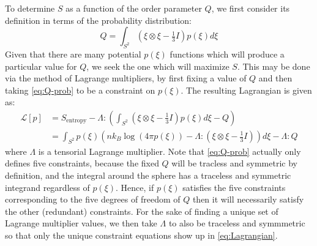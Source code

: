 \documentclass[reqno]{article}
\begin{document}
  To determine $S$ as a function of the order parameter $Q$, we first consider
  its definition in terms of the probability distribution:
  \begin{equation} \label{eq:Q-prob}
    Q
    =
    \int_{S^2} \left(\xi \otimes \xi - \tfrac13 I\right) p(\xi) d\xi
  \end{equation}
  Given that there are many potential $p(\xi)$ functions which will produce a
  particular value for $Q$, we seek the one which will maximize $S$.
  This may be done via the method of Lagrange multipliers, by first fixing a
  value of $Q$ and then taking \eqref{eq:Q-prob} to be a constraint on $p(\xi)$.
  The resulting Lagrangian is given as:
  \begin{equation} \label{eq:Lagrangian}
    \begin{split}
      \mathcal{L}[p]
      &=
      S_\text{entropy} - \Lambda : \left( \int_{S^2} \left(\xi \otimes \xi - \tfrac13 I\right) p(\xi) d\xi - Q \right) \\
      &=
      \int_{S^2} p(\xi)
      \left( n k_B \log \left( 4 \pi p(\xi) \right) - \Lambda : (\xi \otimes \xi - \tfrac13 I) \right) d\xi - \Lambda : Q
    \end{split}
  \end{equation}
  where $\Lambda$ is a tensorial Lagrange multiplier.
  Note that \eqref{eq:Q-prob} actually only defines five constraints, because
  the fixed $Q$ will be tracless and symmetric by definition, and the integral
  around the sphere has a traceless and symmetric integrand regardless of
  $p(\xi)$.
  Hence, if $p(\xi)$ satisfies the five constraints corresponding to the five
  degrees of freedom of $Q$ then it will necessarily satisfy the other
  (redundant) constraints.
  For the sake of finding a unique set of Lagrange multiplier values, we then
  take $\Lambda$ to also be traceless and symmmetric so that only the unique constraint
  equations show up in \eqref{eq:Lagrangian}.
  
\end{document}

